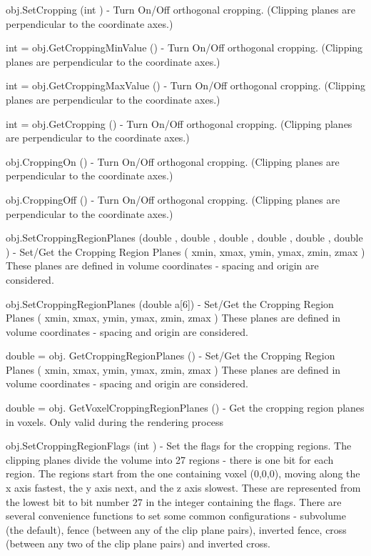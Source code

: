 \begin{DoxyItemize}
\item {\ttfamily obj.\-Set\-Cropping (int )} -\/ Turn On/\-Off orthogonal cropping. (Clipping planes are perpendicular to the coordinate axes.)  
\item {\ttfamily int = obj.\-Get\-Cropping\-Min\-Value ()} -\/ Turn On/\-Off orthogonal cropping. (Clipping planes are perpendicular to the coordinate axes.)  
\item {\ttfamily int = obj.\-Get\-Cropping\-Max\-Value ()} -\/ Turn On/\-Off orthogonal cropping. (Clipping planes are perpendicular to the coordinate axes.)  
\item {\ttfamily int = obj.\-Get\-Cropping ()} -\/ Turn On/\-Off orthogonal cropping. (Clipping planes are perpendicular to the coordinate axes.)  
\item {\ttfamily obj.\-Cropping\-On ()} -\/ Turn On/\-Off orthogonal cropping. (Clipping planes are perpendicular to the coordinate axes.)  
\item {\ttfamily obj.\-Cropping\-Off ()} -\/ Turn On/\-Off orthogonal cropping. (Clipping planes are perpendicular to the coordinate axes.)  
\item {\ttfamily obj.\-Set\-Cropping\-Region\-Planes (double , double , double , double , double , double )} -\/ Set/\-Get the Cropping Region Planes ( xmin, xmax, ymin, ymax, zmin, zmax ) These planes are defined in volume coordinates -\/ spacing and origin are considered.  
\item {\ttfamily obj.\-Set\-Cropping\-Region\-Planes (double a\mbox{[}6\mbox{]})} -\/ Set/\-Get the Cropping Region Planes ( xmin, xmax, ymin, ymax, zmin, zmax ) These planes are defined in volume coordinates -\/ spacing and origin are considered.  
\item {\ttfamily double = obj. Get\-Cropping\-Region\-Planes ()} -\/ Set/\-Get the Cropping Region Planes ( xmin, xmax, ymin, ymax, zmin, zmax ) These planes are defined in volume coordinates -\/ spacing and origin are considered.  
\item {\ttfamily double = obj. Get\-Voxel\-Cropping\-Region\-Planes ()} -\/ Get the cropping region planes in voxels. Only valid during the rendering process  
\item {\ttfamily obj.\-Set\-Cropping\-Region\-Flags (int )} -\/ Set the flags for the cropping regions. The clipping planes divide the volume into 27 regions -\/ there is one bit for each region. The regions start from the one containing voxel (0,0,0), moving along the x axis fastest, the y axis next, and the z axis slowest. These are represented from the lowest bit to bit number 27 in the integer containing the flags. There are several convenience functions to set some common configurations -\/ subvolume (the default), fence (between any of the clip plane pairs), inverted fence, cross (between any two of the clip plane pairs) and inverted cross.  

\end{DoxyItemize}

